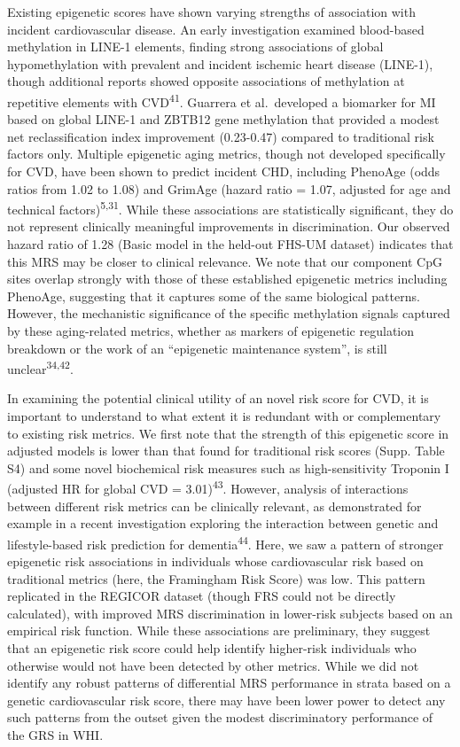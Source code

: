 \documentclass[]{article}
\begin{document}
Existing epigenetic scores have shown varying strengths of association
with incident cardiovascular disease. An early investigation examined
blood-based methylation in LINE-1 elements, finding strong associations
of global hypomethylation with prevalent and incident ischemic heart
disease (LINE-1), though additional reports showed opposite associations
of methylation at repetitive elements with CVD\textsuperscript{41}.
Guarrera et al.~developed a biomarker for MI based on global LINE-1 and
ZBTB12 gene methylation that provided a modest net reclassification
index improvement (0.23-0.47) compared to traditional risk factors only.
Multiple epigenetic aging metrics, though not developed specifically for
CVD, have been shown to predict incident CHD, including PhenoAge (odds
ratios from 1.02 to 1.08) and GrimAge (hazard ratio = 1.07, adjusted for
age and technical factors)\textsuperscript{5,31}. While these
associations are statistically significant, they do not represent
clinically meaningful improvements in discrimination. Our observed
hazard ratio of 1.28 (Basic model in the held-out FHS-UM dataset)
indicates that this MRS may be closer to clinical relevance. We note
that our component CpG sites overlap strongly with those of these
established epigenetic metrics including PhenoAge, suggesting that it
captures some of the same biological patterns. However, the mechanistic
significance of the specific methylation signals captured by these
aging-related metrics, whether as markers of epigenetic regulation
breakdown or the work of an ``epigenetic maintenance system'', is still
unclear\textsuperscript{34,42}.

In examining the potential clinical utility of an novel risk score for
CVD, it is important to understand to what extent it is redundant with
or complementary to existing risk metrics. We first note that the
strength of this epigenetic score in adjusted models is lower than that
found for traditional risk scores (Supp. Table S4) and some novel
biochemical risk measures such as high-sensitivity Troponin I (adjusted
HR for global CVD = 3.01)\textsuperscript{43}. However, analysis of
interactions between different risk metrics can be clinically relevant,
as demonstrated for example in a recent investigation exploring the
interaction between genetic and lifestyle-based risk prediction for
dementia\textsuperscript{44}. Here, we saw a pattern of stronger
epigenetic risk associations in individuals whose cardiovascular risk
based on traditional metrics (here, the Framingham Risk Score) was low.
This pattern replicated in the REGICOR dataset (though FRS could not be
directly calculated), with improved MRS discrimination in lower-risk
subjects based on an empirical risk function. While these associations
are preliminary, they suggest that an epigenetic risk score could help
identify higher-risk individuals who otherwise would not have been
detected by other metrics. While we did not identify any robust patterns
of differential MRS performance in strata based on a genetic
cardiovascular risk score, there may have been lower power to detect any
such patterns from the outset given the modest discriminatory
performance of the GRS in WHI.
\end{document}
